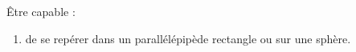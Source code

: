 \begin{myobj}
	Être capable : 
\begin{enumerate}
	\item de se repérer dans un parallélépipède rectangle ou sur une sphère.
\end{enumerate}
\end{myobj}